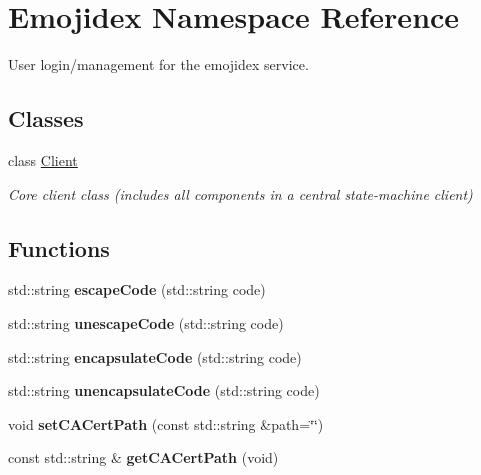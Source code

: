 \hypertarget{namespaceEmojidex}{}\section{Emojidex Namespace Reference}
\label{namespaceEmojidex}


User login/management for the emojidex service.  


\subsection*{Classes}
\begin{DoxyCompactItemize}
\item 
class \hyperlink{classEmojidex_1_1Client}{Client}
\begin{DoxyCompactList}\small\item\em Core client class (includes all components in a central state-\/machine client) \end{DoxyCompactList}\end{DoxyCompactItemize}
\subsection*{Functions}
\begin{DoxyCompactItemize}
\item 
std\+::string {\bfseries escape\+Code} (std\+::string code)\hypertarget{namespaceEmojidex_a58c6cbbe2f4525a174c42b2fd2a660eb}{}\label{namespaceEmojidex_a58c6cbbe2f4525a174c42b2fd2a660eb}

\item 
std\+::string {\bfseries unescape\+Code} (std\+::string code)\hypertarget{namespaceEmojidex_a0a6608a4a3b8c8d84cabadd77d39297d}{}\label{namespaceEmojidex_a0a6608a4a3b8c8d84cabadd77d39297d}

\item 
std\+::string {\bfseries encapsulate\+Code} (std\+::string code)\hypertarget{namespaceEmojidex_ab9b0b9e664523b7c6b9e0a49af50861a}{}\label{namespaceEmojidex_ab9b0b9e664523b7c6b9e0a49af50861a}

\item 
std\+::string {\bfseries unencapsulate\+Code} (std\+::string code)\hypertarget{namespaceEmojidex_ae5eee40c3431039d70697fe3dc8e75d7}{}\label{namespaceEmojidex_ae5eee40c3431039d70697fe3dc8e75d7}

\item 
void {\bfseries set\+C\+A\+Cert\+Path} (const std\+::string \&path=\char`\"{}\char`\"{})\hypertarget{namespaceEmojidex_a38c1393e10c21ea97cd80ecc47d44c30}{}\label{namespaceEmojidex_a38c1393e10c21ea97cd80ecc47d44c30}

\item 
const std\+::string \& {\bfseries get\+C\+A\+Cert\+Path} (void)\hypertarget{namespaceEmojidex_a9f3d9612355b00ab41f242a2ba583804}{}\label{namespaceEmojidex_a9f3d9612355b00ab41f242a2ba583804}

\end{DoxyCompactItemize}
